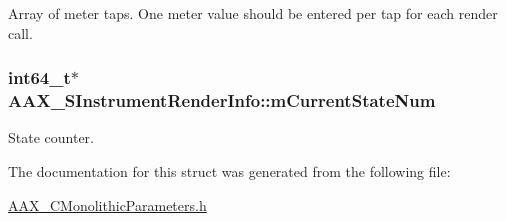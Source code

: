 Array of meter taps. One meter value should be entered per tap for each render call. 

\hypertarget{a00123_a846c5f9e518bb66bf1854a9eb77d54a7}{}
\subsubsection[{m\+Current\+State\+Num}]{\setlength{\rightskip}{0pt plus 5cm}int64\+\_\+t$\ast$ A\+A\+X\+\_\+\+S\+Instrument\+Render\+Info\+::m\+Current\+State\+Num}\label{a00123_a846c5f9e518bb66bf1854a9eb77d54a7}


State counter. 



The documentation for this struct was generated from the following file\+:\begin{DoxyCompactItemize}
\item 
\hyperlink{a00178}{A\+A\+X\+\_\+\+C\+Monolithic\+Parameters.\+h}\end{DoxyCompactItemize}
